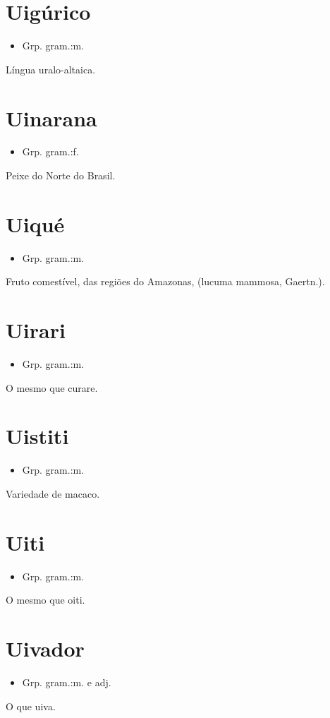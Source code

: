 \documentclass{article}
\begin{document}
\section{Uigúrico}
\begin{itemize}
\item {Grp. gram.:m.}
\end{itemize}
Língua uralo-altaica.
\section{Uinarana}
\begin{itemize}
\item {Grp. gram.:f.}
\end{itemize}
Peixe do Norte do Brasil.
\section{Uiqué}
\begin{itemize}
\item {Grp. gram.:m.}
\end{itemize}
Fruto comestível, das regiões do Amazonas, (\textunderscore lucuma mammosa\textunderscore , Gaertn.).
\section{Uirari}
\begin{itemize}
\item {Grp. gram.:m.}
\end{itemize}
O mesmo que \textunderscore curare\textunderscore .
\section{Uistiti}
\begin{itemize}
\item {Grp. gram.:m.}
\end{itemize}
Variedade de macaco.
\section{Uiti}
\begin{itemize}
\item {Grp. gram.:m.}
\end{itemize}
O mesmo que \textunderscore oiti\textunderscore .
\section{Uivador}
\begin{itemize}
\item {Grp. gram.:m.  e  adj.}
\end{itemize}
O que uiva.
\end{document}
